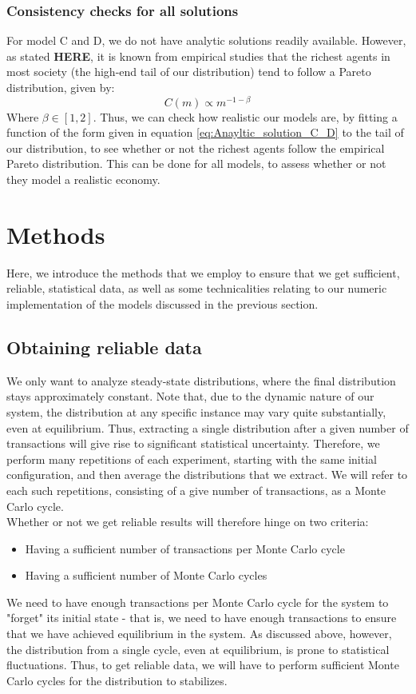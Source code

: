 \documentclass[a4paper, 10pt]{article}
\begin{document}
\subsubsection{Consistency checks for all solutions}
For model C and D, we do not have analytic solutions readily available. However, as stated \textbf{HERE}, it is known from empirical studies that the richest agents in most society (the high-end tail of our distribution) tend to follow a Pareto distribution, given by:
\begin{equation}\label{eq:Anayltic_solution_C_D}
C(m) \propto m^{-1-\beta}
\end{equation}
Where $\beta \in [1,2]$. Thus, we can check how realistic our models are, by fitting a function of the form given in equation \ref{eq:Anayltic_solution_C_D} to the tail of our distribution, to see whether or not the richest agents follow the empirical Pareto distribution. This can be done for all models, to assess whether or not they model a realistic economy.
\section{Methods}\label{Method_section}
Here, we introduce the methods that we employ to ensure that we get sufficient, reliable, statistical data, as well as some technicalities relating to our numeric implementation of the models discussed in the previous section.
\subsection{Obtaining reliable data}
We only want to analyze steady-state distributions, where the final distribution stays approximately constant. Note that, due to the dynamic nature of our system, the distribution at any specific instance may vary quite substantially, even at equilibrium. Thus, extracting a single distribution after a given number of transactions will give rise to significant statistical uncertainty. Therefore, we perform many repetitions of each experiment, starting with the same initial configuration, and then average the distributions that we extract. We will refer to each such repetitions, consisting of a give number of transactions, as a Monte Carlo cycle.\\
\linebreak
Whether or not we get reliable results will therefore hinge on two criteria:
\begin{itemize}
\item Having a sufficient number of transactions per Monte Carlo cycle
\item Having a sufficient number of Monte Carlo cycles
\end{itemize}
We need to have enough transactions per Monte Carlo cycle for the system to "forget" its initial state - that is, we need to have enough transactions to ensure that we have achieved equilibrium in the system. As discussed above, however, the distribution from a single cycle, even at equilibrium, is prone to statistical fluctuations. Thus, to get reliable data, we will have to perform sufficient Monte Carlo cycles for the distribution to stabilizes.\\
\end{document}
